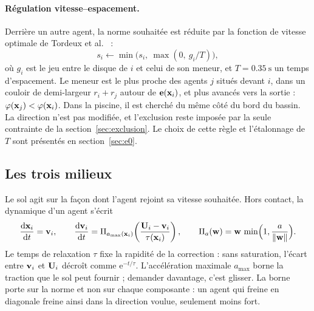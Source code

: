 \paragraph{Régulation vitesse--espacement.}
Derrière un autre agent, la norme souhaitée est réduite par la fonction de
vitesse optimale de Tordeux et al.~\cite{tordeux2016} :
\begin{equation}
\label{eq:espacement}
s_i \longleftarrow \min\bigl(s_i,\ \max(0,\ g_i/T)\bigr),
\end{equation}
où $g_i$ est le jeu entre le disque de $i$ et celui de son meneur, et
$T=\SI{0.35}{\second}$ un temps d'espacement. Le meneur est le plus proche des
agents $j$ situés devant $i$, dans un couloir de demi-largeur $r_i+r_j$ autour
de $\mathbf{e}(\mathbf{x}_i)$, et plus avancés vers la sortie : $\varphi(\mathbf{x}_j)<\varphi(\mathbf{x}_i)$.
Dans la piscine, il est cherché du même côté du bord du bassin. La direction
n'est pas modifiée, et l'exclusion reste imposée par la seule contrainte de la
section~\ref{sec:exclusion}. Le choix de cette règle et l'étalonnage de $T$ sont
présentés en section~\ref{sec:e0}.

\subsection{Les trois milieux}
\label{sec:milieux}

Le sol agit sur la façon dont l'agent rejoint sa vitesse souhaitée. Hors
contact, la dynamique d'un agent s'écrit
\begin{equation}
\label{eq:relaxation}
\frac{\mathrm{d}\mathbf{x}_i}{\mathrm{d}t}=\mathbf{v}_i,
\qquad
\frac{\mathrm{d}\mathbf{v}_i}{\mathrm{d}t}
=\Pi_{a_{\max}(\mathbf{x}_i)}\!\left(\frac{\mathbf{U}_i-\mathbf{v}_i}{\tau(\mathbf{x}_i)}\right),
\qquad
\Pi_{a}(\mathbf{w})=\mathbf{w}\,\min\Bigl(1,\frac{a}{\left\lVert \mathbf{w} \right\rVert}\Bigr).
\end{equation}
Le temps de relaxation $\tau$ fixe la rapidité de la correction : sans
saturation, l'écart entre $\mathbf{v}_i$ et $\mathbf{U}_i$ décroît comme
$\mathrm{e}^{-t/\tau}$. L'accélération maximale $a_{\max}$ borne la traction que
le sol peut fournir ; demander davantage, c'est glisser. La borne porte sur la
norme et non sur chaque composante : un agent qui freine en diagonale freine
ainsi dans la direction voulue, seulement moins fort.

